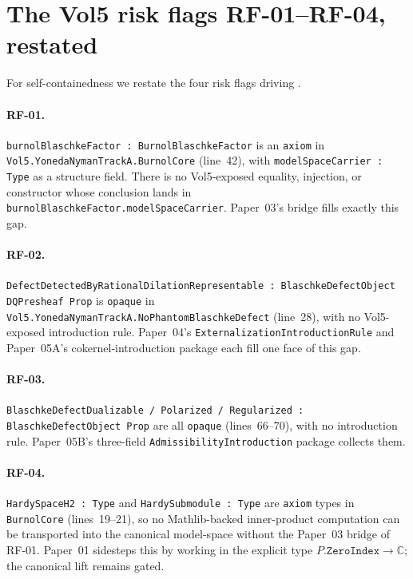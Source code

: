 \documentclass[11pt]{article}
\theoremstyle{plain}
\theoremstyle{definition}
\theoremstyle{remark}
\newcommand{\C}{\mathbb{C}}
\newcommand{\code}[1]{\texttt{#1}}
\begin{document}
\section{The Vol5 risk flags RF-01--RF-04, restated}
\label{sec:rf01-rf04}

For self-containedness we restate the four risk flags driving
.

\paragraph{RF-01.}
\code{burnolBlaschkeFactor : BurnolBlaschkeFactor} is an
\code{axiom} in
\code{Vol5.YonedaNymanTrackA.BurnolCore} (line~42), with
\code{modelSpaceCarrier : Type} as a structure field. There is
no Vol5-exposed equality, injection, or constructor whose
conclusion lands in \code{burnolBlaschkeFactor.modelSpaceCarrier}.
Paper~03's bridge fills exactly this gap.

\paragraph{RF-02.}
\code{DefectDetectedByRationalDilationRepresentable :
   BlaschkeDefectObject \to DQPresheaf \to Prop} is
\code{opaque} in \code{Vol5.YonedaNymanTrackA.NoPhantomBlaschkeDefect}
(line~28), with no Vol5-exposed introduction rule. Paper~04's
\code{ExternalizationIntroductionRule} and Paper~05A's
cokernel-introduction package each fill one face of this gap.

\paragraph{RF-03.}
\code{BlaschkeDefectDualizable / Polarized / Regularized :
   BlaschkeDefectObject \to Prop} are all \code{opaque}
(lines~66--70), with no introduction rule. Paper~05B's three-field
\code{AdmissibilityIntroduction} package collects them.

\paragraph{RF-04.}
\code{HardySpaceH2 : Type} and \code{HardySubmodule : Type}
are \code{axiom} types in \code{BurnolCore} (lines~19--21), so
no Mathlib-backed inner-product computation can be transported into
the canonical model-space without the Paper~03 bridge of RF-01.
Paper~01 sidesteps this by working in the explicit type
\(P.\code{ZeroIndex} \to \C\); the canonical lift remains gated.
\end{document}
